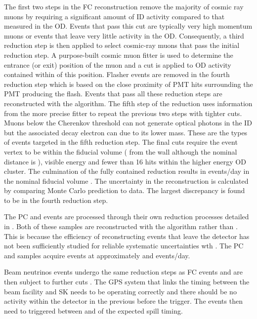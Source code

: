 The first two steps in the FC reconstruction remove the majority of cosmic ray muons by requiring a significant amount of ID activity compared to that measured in the OD. Events that pass this cut are typically very high momentum muons or events that leave very little activity in the OD. Consequently, a third reduction step is then applied to select cosmic-ray muons that pass the initial reduction step. A purpose-built cosmic muon fitter is used to determine the entrance (or exit) position of the muon and a cut is applied to OD activity contained within  of this position. Flasher events are removed in the fourth reduction step which is based on the close proximity of PMT hits surrounding the PMT producing the flash. Events that pass all these reduction steps are reconstructed with the \apfit algorithm. The fifth step of the reduction uses information from the more precise fitter to repeat the previous two steps with tighter cuts. Muons below the Cherenkov threshold can not generate optical photons in the ID but the associated decay electron can due to its lower mass. These are the types of events targeted in the fifth reduction step. The final cuts require the event vertex to be within the fiducial volume ( from the wall although the nominal distance is ), visible energy  and fewer than 16 hits within the higher energy OD cluster. The culmination of the fully contained reduction results in  events/day in the nominal fiducial volume \cite{thesis_miao}. The uncertainty in the reconstruction is calculated by comparing Monte Carlo prediction to data. The largest discrepancy is found to be  in the fourth reduction step.

The PC and  events are processed through their own reduction processes detailed in \cite{Ashie_2005}. Both of these samples are reconstructed with the \apfit algorithm rather than \fq. This is because the efficiency of reconstructing events that leave the detector has not been sufficiently studied for reliable systematic uncertainties wth \fq. The PC and  samples acquire events at approximately  and  events/day.

Beam neutrinos events undergo the same reduction steps as FC events and are then subject to further cuts \cite{t2k_tn_027}. The GPS system that links the timing between the beam facility and SK needs to be operating correctly and there should be no activity within the detector in the previous  before the trigger. The events then need to triggered between  and  of the expected spill timing.


